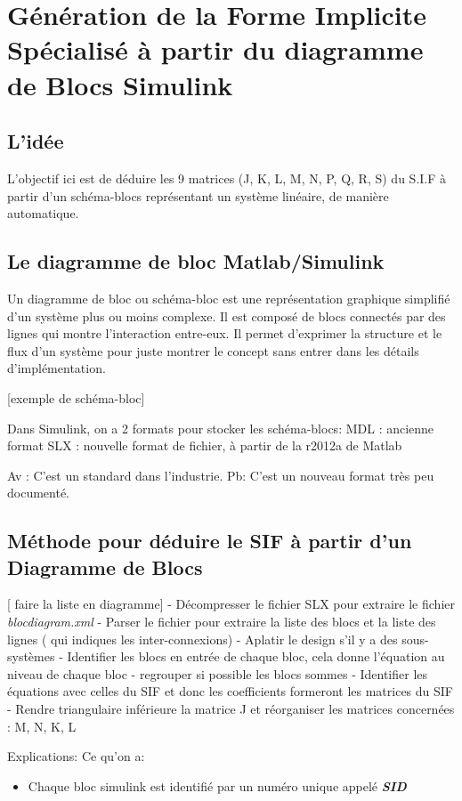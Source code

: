 \chapter{Génération de la Forme Implicite Spécialisé à partir du diagramme de Blocs Simulink}

\section{L'idée}
L'objectif ici est de déduire les 9 matrices (J, K, L, M, N, P, Q, R, S) du S.I.F à partir d'un schéma-blocs représentant un système linéaire, de manière automatique.

\section{Le diagramme de bloc Matlab/Simulink}
Un diagramme de bloc ou schéma-bloc est une représentation graphique simplifié d'un système plus ou moins complexe. Il est composé de blocs connectés par des lignes qui montre l'interaction entre-eux.
Il permet d'exprimer la structure et le flux d'un système pour juste montrer le concept sans entrer dans les détails d'implémentation.

[exemple de schéma-bloc]


Dans Simulink, on a 2 formats pour stocker les schéma-blocs:
MDL : ancienne format
SLX : nouvelle format de fichier, à partir de la r2012a de Matlab


Av : C'est un standard dans l'industrie.
Pb: C'est un nouveau format très peu documenté.


\section{Méthode pour déduire le SIF à partir d'un Diagramme de Blocs}
[ faire la liste en diagramme]
 - Décompresser le fichier SLX pour extraire le fichier \emph{blocdiagram.xml}
 - Parser le fichier pour extraire la liste des blocs et la liste des lignes ( qui indiques les inter-connexions)
 - Aplatir le design s'il y a des sous-systèmes
 - Identifier les blocs en entrée de chaque bloc, cela donne l'équation au niveau de chaque bloc
 - regrouper si possible les blocs sommes 
 - Identifier les équations avec celles du SIF et donc les coefficients formeront les matrices du SIF
 - Rendre triangulaire inférieure la matrice J et réorganiser les matrices concernées : M, N, K, L
 
Explications:
Ce qu'on a:
\begin{itemize}
\item Chaque bloc simulink est identifié par un numéro unique appelé \textbf{\emph{SID}}
\end{itemize}


